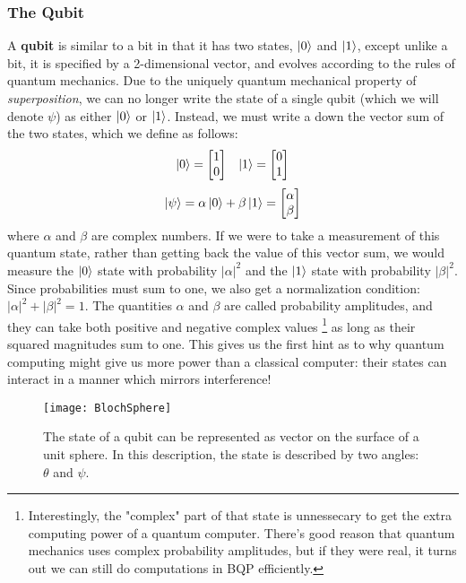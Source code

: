 \subsubsection{The Qubit}
A \textbf{qubit} is similar to a bit in that it has two states, $\ket{0}$ and $\ket{1}$, except unlike a bit, it is specified
by a 2-dimensional vector, and evolves according to the rules of quantum mechanics. Due to the uniquely quantum
mechanical property of \emph{superposition}, we can no longer write the state of a single qubit (which we will
denote $\psi$) as either $\ket{0}$ or $\ket{1}$. Instead, we must write a down the vector sum of the two states,
which we define as follows:
\begin{align}
  \label{eqn:basisstates}
  \ket{0} = \begin{bmatrix}1\\0\end{bmatrix} && \ket{1} = \begin{bmatrix}0\\1\end{bmatrix}
\end{align}
\begin{equation}
  \ket{\psi} = \alpha \ket{0} + \beta \ket{1} = \begin{bmatrix}\alpha\\\beta\end{bmatrix}
\end{equation}
where $\alpha$ and $\beta$ are complex numbers. If we were to take a measurement of this quantum state,
rather than getting back the value of this vector sum, we would measure the $\ket{0}$ state with probability
$|\alpha|^2$ and the $\ket{1}$ state with probability $|\beta|^2$. Since probabilities must sum to one, we also
get a normalization condition: $|\alpha|^2 + |\beta|^2 = 1$. The quantities $\alpha$ and $\beta$ are called
probability amplitudes, and they can take both positive and negative complex values
\footnote{Interestingly, the "complex" part of that state is unnessecary to get the extra computing power
  of a quantum computer\cite{doi:10.1142/S0219749913500019}. There's good reason that quantum mechanics 
  uses complex probability amplitudes\cite{2004quant.ph..1062A}, but if they were real, it turns out
  we can still do computations in \textsc{BQP} efficiently.} 
as long as their squared magnitudes sum to one. This gives us the first hint as to why quantum computing
might give us more power than a classical computer: their states can interact in a manner which mirrors
interference!

\begin{figure}
  \texttt{[image: BlochSphere]}
  \caption[The Bloch Sphere representation of a qubit]
  {The state of a qubit can be represented as vector on the surface of a unit sphere. In this description, 
  the state is described by two angles: $\theta$ and $\psi$.}
  \label{fig:bloch}
\end{figure}

